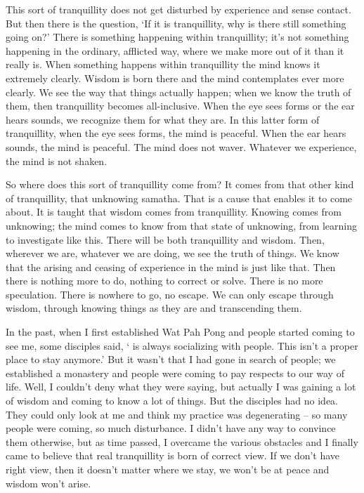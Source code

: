 This sort of tranquillity does not get disturbed by experience and sense contact. But then there is the question, `If it is tranquillity, why is there still something going on?' There is something happening within tranquillity; it's not something happening in the ordinary, afflicted way, where we make more out of it than it really is. When something happens within tranquillity the mind knows it extremely clearly. Wisdom is born there and the mind contemplates ever more clearly. We see the way that things actually happen; when we know the truth of them, then tranquillity becomes all-inclusive. When the eye sees forms or the ear hears sounds, we recognize them for what they are. In this latter form of tranquillity, when the eye sees forms, the mind is peaceful. When the ear hears sounds, the mind is peaceful. The mind does not waver. Whatever we experience, the mind is not shaken. 

So where does this sort of tranquillity come from? It comes from that other kind of tranquillity, that unknowing samatha. That is a cause that enables it to come about. It is taught that wisdom comes from tranquillity. Knowing comes from unknowing; the mind comes to know from that state of unknowing, from learning to investigate like this. There will be both tranquillity and wisdom. Then, wherever we are, whatever we are doing, we see the truth of things. We know that the arising and ceasing of experience in the mind is just like that. Then there is nothing more to do, nothing to correct or solve. There is no more speculation. There is nowhere to go, no escape. We can only escape through wisdom, through knowing things as they are and transcending them. 

In the past, when I first established Wat Pah Pong and people started coming to see me, some disciples said, ` is always socializing with people. This isn't a proper place to stay anymore.' But it wasn't that I had gone in search of people; we established a monastery and people were coming to pay respects to our way of life. Well, I couldn't deny what they were saying, but actually I was gaining a lot of wisdom and coming to know a lot of things. But the disciples had no idea. They could only look at me and think my practice was degenerating -- so many people were coming, so much disturbance. I didn't have any way to convince them otherwise, but as time passed, I overcame the various obstacles and I finally came to believe that real tranquillity is born of correct view. If we don't have right view, then it doesn't matter where we stay, we won't be at peace and wisdom won't arise. 

